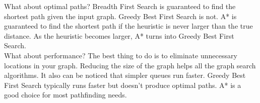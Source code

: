 \documentclass[a4paper]{article}
\begin{document}
\noindent What about optimal paths? Breadth First Search is guaranteed to find the shortest path given the input graph. Greedy Best First Search is not. A* is guaranteed to find the shortest path if the heuristic is never larger than the true distance. As the heuristic becomes larger, A* turns into Greedy Best First Search.\\

\noindent What about performance? The best thing to do is to eliminate unnecessary locations in your graph. Reducing the size of the graph helps all the graph search algorithms. It also can be noticed that simpler queues run faster. Greedy Best First Search typically runs faster but doesn’t produce optimal paths. A* is a good choice for most pathfinding needs. \\

\vfill




\nocite{*}




\end{document}
